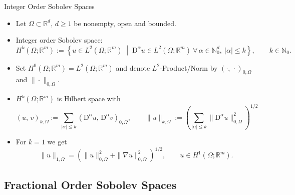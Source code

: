 \documentclass[10pt,aspectratio=169]{beamer}
\def\N{{\mathbb N}}
\def\R{{\mathbb R}}
\def\Diff{{\mathrm{D}}}
\begin{document}
\begin{frame}{Integer Order Sobolev Spaces}
	\begin{itemize}
		\item Let $\Omega\subset\R^d,\,d\ge 1$ be nonempty, open and bounded.
		\item Integer order Sobolev space:
		      \begin{equation*}
			      H^k(\Omega;\R^m)
			      :=
			      \left\{u\in L^2(\Omega;\R^m)\;\middle|\; \Diff^\alpha u\in L^2(\Omega;\R^m)\ \forall\,\alpha\in\N_0^d,\ |\alpha|\le k\right\},\qquad k\in\N_0.
		      \end{equation*}
		\item Set $H^0(\Omega;\R^m) = L^2(\Omega;\R^m)$ and denote $L^2$-Product/Norm by $(\cdot,\,\cdot)_{0,\Omega}$ and $\|\cdot\|_{0,\Omega}$.
		\item $H^k(\Omega;\R^m)$ is Hilbert space with
		      \begin{equation*}
			      (u,\, v)_{k,\Omega}:= \sum_{|\alpha|\le k}(\Diff^\alpha u,\, \Diff^\alpha v)_{0,\Omega},\qquad \|u\|_{k,\Omega}
			      :=
			      \left(
			      \sum_{|\alpha|\le k}\|\Diff^\alpha u\|_{0,\Omega}^2
			      \right)^{1/2}
		      \end{equation*}
		\item For $k=1$ we get
		      \begin{equation*}
			      \|u\|_{1,\Omega} = \left(\|u\|_{0,\Omega}^2 + \|\nabla u\|_{0,\Omega}^2\right)^{1/2},\qquad u\in H^1(\Omega;\R^m).
		      \end{equation*}
	\end{itemize}
\end{frame}

\subsection{Fractional Order Sobolev Spaces}
\end{document}
